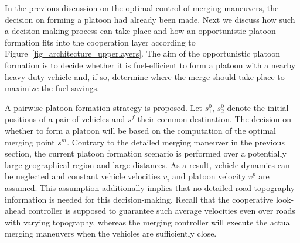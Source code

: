 \documentclass[journal]{IEEEtran}
\begin{document}
In the previous discussion on the optimal control of merging maneuvers, the decision on forming a platoon had already been made. Next we discuss how such a decision-making process can take place and how an opportunistic platoon formation fits into the cooperation layer according to Figure~\ref{fig_architecture_upperlayers}. The aim of the opportunistic platoon formation is to decide whether it is fuel-efficient to form a platoon with a nearby heavy-duty vehicle and, if so, determine where the merge should take place to maximize the fuel savings.

A pairwise platoon formation strategy is proposed. Let $s_1^0$, $s_2^0$ denote the initial positions of a pair of vehicles and $s^f$ their common destination. The decision on whether to form a platoon will be based on the computation of the optimal merging point $s^m$. Contrary to the detailed merging maneuver in the previous section, the current platoon formation scenario is  performed over a potentially large geographical region and large distances. As a result, vehicle dynamics can be neglected and constant vehicle velocities $\bar{v}_i$ and platoon velocity $\bar{v}^p$ are assumed. This assumption additionally implies that no detailed road topography information is needed for this decision-making. Recall that the cooperative look-ahead controller is supposed to guarantee such average velocities even over roads with varying topography, whereas the merging controller will execute the actual merging maneuvers when the vehicles are sufficiently close.
\end{document}
